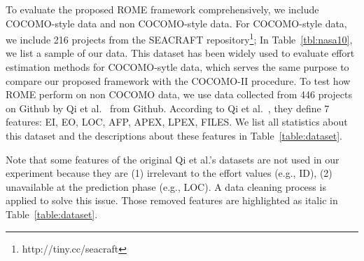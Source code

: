 \documentclass[sigconf,review,anonymous]{acmart}
\newcommand{\tbl}[1]{Table~\ref{tbl:#1}}
\begin{document}
To evaluate the proposed ROME framework comprehensively, we include COCOMO-style data and non COCOMO-style data. For COCOMO-style data, we include 216 projects from the SEACRAFT repository\footnote{http://tiny.cc/seacraft}; In \tbl{nasa10}, we list a sample of our data. This dataset has been widely used to evaluate effort estimation methods for COCOMO-sytle data, which serves the same purpose to compare our proposed framework with the COCOMO-II procedure. 
To test how ROME perform on non COCOMO data, we use data  collected from  446 projects on Github by Qi et al.~\cite{qi2017software} from Github. 
According to Qi et al.~\cite{qi2017software}, they define 7 features: EI, EO, LOC, AFP, APEX, LPEX, FILES. We list all statistics about this dataset and the descriptions about these features in Table~\ref{table:dataset}. 

Note that some features of the original Qi et al.'s datasets are not used in our experiment because they are (1) irrelevant to the effort values (e.g., ID), (2) unavailable at the prediction phase (e.g., LOC). A data cleaning process is applied to solve this issue. 
Those removed features are highlighted as italic in Table~\ref{table:dataset}.
\end{document}

